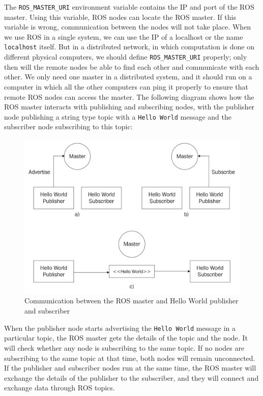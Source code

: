 \documentclass[../../main]{subfiles}
\begin{document}
The \texttt{ROS\_MASTER\_URI} environment variable contains the IP and port of the ROS master. Using this variable, ROS nodes can locate the ROS master. If this variable is wrong, communication between the nodes will not take place. When we use ROS in a single system, we can use the IP of a localhost or the name \texttt{localhost} itself. But in a distributed network, in which computation is done on different physical computers, we should define \texttt{ROS\_MASTER\_URI} properly; only then will the remote nodes be able to find each other and communicate with each other. We only need one master in a distributed system, and it should run on a computer in which all the other computers can ping it properly to ensure that remote ROS nodes can access the master.
\newpage
The following diagram shows how the ROS master interacts with publishing and
subscribing nodes, with the publisher node publishing a string type topic with a \texttt{Hello
World} message and the subscriber node subscribing to this topic:
\begin{figure}[ht]
    \centering
    \includegraphics{img/helloWorld.jpg}
    \caption{Communication between the ROS master and Hello World publisher and subscriber}
\end{figure}
When the publisher node starts advertising the \texttt{Hello World} message in a particular
topic, the ROS master gets the details of the topic and the node. It will check whether any
node is subscribing to the same topic. If no nodes are subscribing to the same topic at that
time, both nodes will remain unconnected. If the publisher and subscriber nodes run at
the same time, the ROS master will exchange the details of the publisher to the subscriber,
and they will connect and exchange data through ROS topics.
\end{document}
